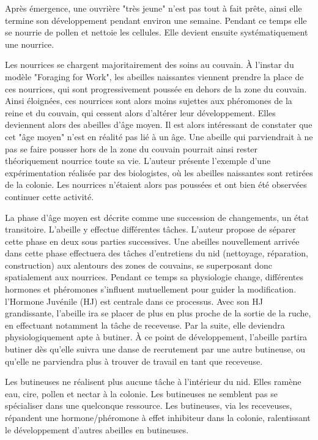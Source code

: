         Après émergence, une ouvrière "très jeune" n'est pas tout à fait prête, ainsi elle termine son développement pendant environ une semaine. Pendant ce temps elle se nourrie de pollen et nettoie les cellules. Elle devient ensuite systématiquement une nourrice. 
        
        Les nourrices se chargent majoritairement des soins au couvain. À l'instar du modèle "Foraging for Work", les abeilles naissantes viennent prendre la place de ces nourrices, qui sont progressivement poussée en dehors de la zone du couvain. Ainsi éloignées, ces nourrices sont alors moins sujettes aux phéromones de la reine et du couvain, qui cessent alors d'altérer leur développement. Elles deviennent alors des abeilles d'âge moyen. Il est alors intéressant de constater que cet "âge moyen" n'est en réalité pas lié à un âge. Une abeille qui parviendrait à ne pas se faire pousser hors de la zone du couvain pourrait ainsi rester théoriquement nourrice toute sa vie. L'auteur présente l'exemple d'une expérimentation réalisée par des biologistes, où les abeilles naissantes sont retirées de la colonie. Les nourrices n'étaient alors pas poussées et ont bien été observées continuer cette activité.
        
        La phase d'âge moyen est décrite comme une succession de changements, un état transitoire. L'abeille y effectue différentes tâches. L'auteur propose de séparer cette phase en deux sous parties successives. Une abeilles nouvellement arrivée dans cette phase effectuera des tâches d'entretiens du nid (nettoyage, réparation, construction) aux alentours des zones de couvains, se superposant donc spatialement aux nourrices. Pendant ce temps sa physiologie change, différentes hormones et phéromones s'influent mutuellement pour guider la modification. l'Hormone Juvénile (HJ) est centrale dans ce processus. Avec son HJ grandissante, l'abeille ira se placer de plus en plus proche de la sortie de la ruche, en effectuant notamment la tâche de receveuse. Par la suite, elle deviendra physiologiquement apte à butiner. À ce point de développement, l'abeille partira butiner dès qu'elle suivra une danse de recrutement par une autre butineuse, ou qu'elle ne parviendra plus à trouver de travail en tant que receveuse.
        
        Les butineuses ne réalisent plus aucune tâche à l'intérieur du nid. Elles ramène eau, cire, pollen et nectar à la colonie. Les butineuses ne semblent pas se spécialiser dans une quelconque ressource. Les butineuses, via les receveuses, répandent une hormone/phéromone à effet inhibiteur dans la colonie, ralentissant le développement d'autres abeilles en butineuses.
        
